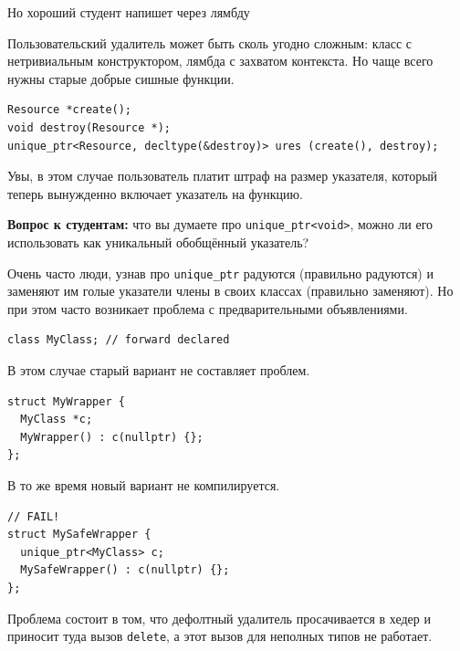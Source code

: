 \documentclass[a4paper,12pt,oneside]{book}
\newif\ifanswers
\begin{document}
Но хороший студент напишет через лямбду
\fi

Пользовательский удалитель может быть сколь угодно сложным: класс с нетривиальным конструктором, лямбда с захватом контекста. Но чаще всего нужны старые добрые сишные функции.

\begin{lstlisting}
Resource *create();
void destroy(Resource *);
unique_ptr<Resource, decltype(&destroy)> ures (create(), destroy);
\end{lstlisting}

Увы, в этом случае пользователь платит штраф на размер указателя, который теперь вынужденно включает указатель на функцию.

\textbf{Вопрос к студентам:} что вы думаете про \lstinline!unique_ptr<void>!, можно ли его использовать как уникальный обобщённый указатель?

\ifanswers
Проблемы, как водится, будут с удалением. Работать может примерно такая городушка:

\begin{lstlisting}
template <typename T>
struct VDel {
  void operator()(void *s) { delete static_cast<T*>(s); }
};
unique_ptr<void, VDel<int>> u(new int(42));
\end{lstlisting}
\fi

Очень часто люди, узнав про \lstinline!unique_ptr! радуются (правильно радуются) и заменяют им голые указатели члены в своих классах (правильно заменяют). Но при этом часто возникает проблема с предварительными объявлениями.

\begin{lstlisting}
class MyClass; // forward declared
\end{lstlisting}

В этом случае старый вариант не составляет проблем.

\begin{lstlisting}
struct MyWrapper {
  MyClass *c;
  MyWrapper() : c(nullptr) {};
};
\end{lstlisting}

В то же время новый вариант не компилируется.

\begin{lstlisting}
// FAIL!
struct MySafeWrapper {
  unique_ptr<MyClass> c; 
  MySafeWrapper() : c(nullptr) {};
};
\end{lstlisting}

Проблема состоит в том, что дефолтный удалитель просачивается в хедер и приносит туда вызов \lstinline!delete!, а этот вызов для неполных типов не работает.
\end{document}
